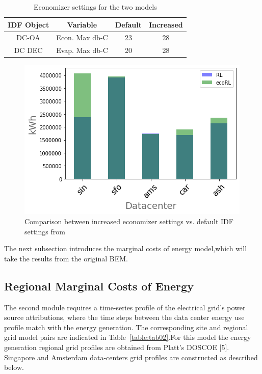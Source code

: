   
  \begin{table}[ht]
  \begin{small}
    \vspace{-10 pt}
    \caption{Economizer settings for the two models}
    \label{table:tab01}
    \centering
    \begin{tabular}{| c | c | c |c| }
      \hline
      IDF Object & Variable & Default & Increased\\
      \hline  \hline
      DC-OA & Econ. Max db-C & 23 & 28 \\
      \hline
      DC DEC & Evap. Max db-C & 20 & 28 \\
      \hline
    \end{tabular}
    \vspace{-8 pt}   %
    \end{small}
    \end{table}

  \begin{figure}
    \centering
    \includegraphics[scale=.45]{marginal_energy_cost/img/total_energy_comp.png}
    \caption[Comparison of Economizer Settings in E+]{Comparison between increased economizer settings  vs. default IDF settings from \cite{kumar20} }
    \label{fig:total_energy_comp}
    \end{figure}

  The next subsection introduces the marginal costs of energy model,which will take the results from the original BEM.

\subsection{Regional Marginal Costs of Energy}
The second module requires a time-series profile of the electrical grid’s power source attributions, where the time steps between the data center energy use profile match with the energy generation.  The corresponding  site and regional grid model pairs are indicated in Table~\ref{table:tab02}.For this model the energy generation regional grid profiles are obtained from Platt’s DOSCOE [5]. Singapore and Amsterdam data-centers grid profiles are constructed as described below.

